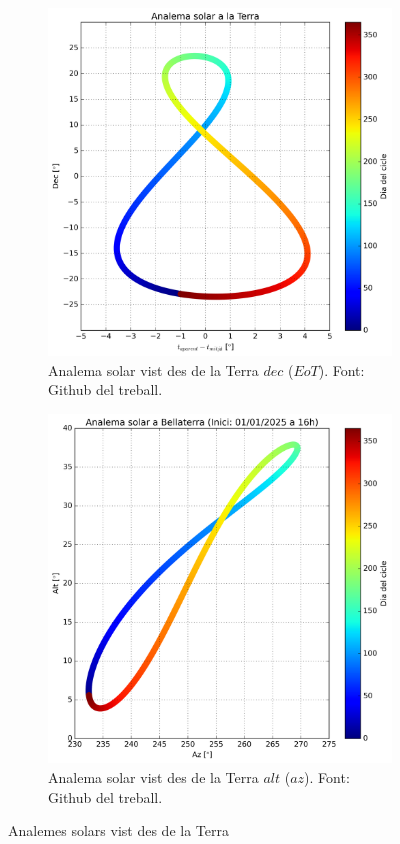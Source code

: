 \documentclass[a4paper, 11pt]{article}
\begin{document}
\begin{figure}[h!]
    \centering
    \begin{subfigure}{0.45\textwidth}
        \centering
        \includegraphics[width=\textwidth]{images/analema_dec_eot.png}
        \caption{Analema solar vist des de la Terra $dec$ ($EoT$). Font: Github del treball.}
    \end{subfigure}
    \hspace{0.05\textwidth}
    \begin{subfigure}{0.45\textwidth}
        \centering
        \includegraphics[width=\textwidth]{images/analema_alt_az.png}
        \caption{Analema solar vist des de la Terra $alt$ ($az$). Font: Github del treball.}
    \end{subfigure}
\caption{Analemes solars vist des de la Terra}
\label{fig:analema_terra}
\end{figure}
\end{document}
